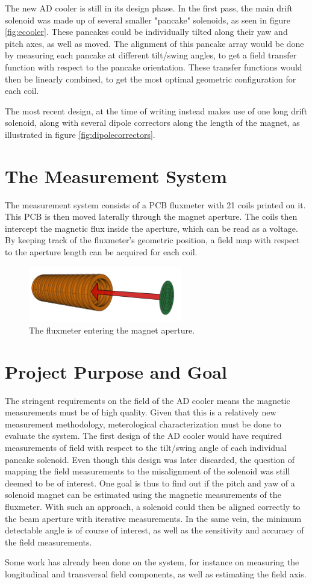 The new AD cooler is still in its design phase. In the first pass,
the main drift solenoid was made up of several smaller "pancake"
solenoids, as seen in figure \ref{fig:ecooler}. These pancakes could
be individually tilted along their yaw and pitch axes, as well as moved.
The alignment of this pancake array would be done by measuring each
pancake at different tilt/swing angles, to get a field transfer function
with respect to the pancake orientation. These transfer functions would
then be linearly combined, to get the most optimal geometric configuration
for each coil.

The most recent design, at the time of writing instead makes use of 
one long drift solenoid, along with several dipole correctors along the
length of the magnet, as illustrated in figure \ref{fig:dipolecorrectors}.

\section{The Measurement System}
The measurement system consists of a PCB fluxmeter with 21 coils printed on it.
This PCB is then moved laterally through the magnet aperture. 
The coils then intercept the magnetic flux inside the aperture,
which can be read as a voltage. By keeping track of the fluxmeter's
geometric position, a field map with respect to the aperture length
can be acquired for each coil.

\begin{figure}[!h]
    \centering
    \includegraphics[width=0.6\textwidth]{figs/pcbpath}
    \caption{The fluxmeter entering the magnet aperture.}
    \label{fig:pcbpath}
\end{figure}

\section{Project Purpose and Goal}
The stringent requirements on the field of the AD cooler means the 
magnetic measurements must be of high quality. Given that this is 
a relatively new measurement methodology, meterological characterization
must be done to evaluate the system. The first design of the AD cooler
would have required measurements of field with respect to the tilt/swing
angle of each individual pancake solenoid. Even though this design was
later discarded, the question of mapping the field measurements to 
the misalignment of the solenoid was still deemed to be of interest.
One goal is thus to find out if the pitch and yaw of a solenoid magnet 
can be estimated using the magnetic measurements of the fluxmeter.
With such an approach, a solenoid could then be aligned correctly
to the beam aperture with iterative measurements.
In the same vein, the minimum detectable angle is of course of interest,
as well as the sensitivity and accuracy of the field measurements. 

Some work has already been done on the system, for instance on measuring
the longitudinal and transversal field components, as well as estimating 
the field axis. \cite{inductioncoilmeas}